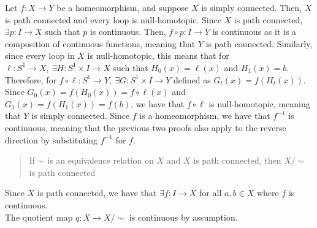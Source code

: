\documentclass[12pt]{extarticle}
\begin{document}
  Let $f:X\rightarrow Y$ be a homeomorphism, and suppose $X$ is simply connected. Then, $X$ is path connected and every loop is null-homotopic. Since $X$ is path connected, $\exists p:I\rightarrow X$ such that $p$ is continuous. Then, $f\circ p: I\rightarrow Y$ is continuous as it is a composition of continuous functions, meaning that $Y$ is path connected. Similarly, since every loop in $X$ is null-homotopic, this means that for $\ell:S^1\rightarrow X,~\exists H:S^{1}\times I\rightarrow X$ such that $H_0(x) = \ell(x)$ and $H_1(x) = b$. Therefore, for $f\circ \ell: S^1\rightarrow Y,~\exists G:S^1\times I\rightarrow Y$ defined as $G_t(x) = f(H_t(x))$. Since $G_0(x) = f(H_0(x)) = f\circ \ell(x)$ and $G_1(x) = f(H_1(x)) = f(b)$, we have that $f\circ \ell$ is null-homotopic, meaning that $Y$ is simply connected. Since $f$ is a homeomorphism, we have that $f^{-1}$ is continuous, meaning that the previous two proofs also apply to the reverse direction by substituting $f^{-1}$ for $f$.
  \begin{quote}
     If $\sim$ is an equivalence relation on $X$ and $X$ is path connected, then $X/\sim$ is path connected
  \end{quote}
Since $X$ is path connected, we have that $\exists f: I\rightarrow X$ for all $a,b\in X$ where $f$ is continuous.\\

\noindent The quotient map $q:X\rightarrow X/\sim$ is continuous by assumption.\\
\end{document}
